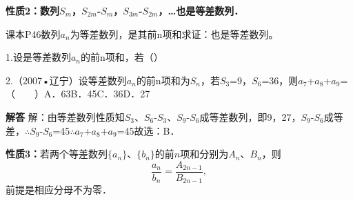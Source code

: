 \par\medskip\noindent\textbf{性质2：数列\ensuremath{S_{m}}，\ensuremath{S_{2m}}-\ensuremath{S_{m}}，\ensuremath{S_{3m}}-\ensuremath{S_{2m}}，\ldots{}也是等差数列．}\par
\qquad{}课本P46数列{\ensuremath{a_{n}}}为等差数列，是其前n项和求证：也是等差数列。\par
{}
1.设是等差数列{\ensuremath{a_{n}}}的前n项和，若（）\par
{}
2.（2007•辽宁）设等差数列{\ensuremath{a_{n}}}的前n项和为\ensuremath{S_{n}}，若\ensuremath{S_{3}}=9，\ensuremath{S_{6}}=36，则\ensuremath{a_{7}}+\ensuremath{a_{8}}+\ensuremath{a_{9}}=（　　）A．63\qquad{}B．45\qquad{}C．36\qquad{}D．27\qquad{}\par
\QuestionSpace{1.2cm}
\ifshowanswers
\par\begingroup\color{solutioncolor}\noindent\textbf{解答}\quad
解：由等差数列性质知\ensuremath{S_{3}}、\ensuremath{S_{6}}-\ensuremath{S_{3}}、\ensuremath{S_{9}}-\ensuremath{S_{6}}成等差数列，即9，27，\ensuremath{S_{9}}-\ensuremath{S_{6}}成等差，\ensuremath{\therefore}\ensuremath{S_{9}}-\ensuremath{S_{6}}=45\ensuremath{\therefore}\ensuremath{a_{7}}+\ensuremath{a_{8}}+\ensuremath{a_{9}}=45故选：B．\par
\par\endgroup\fi

\par\medskip\noindent\textbf{性质3：}若两个等差数列$\{a_n\}$、$\{b_n\}$的前$n$项和分别为$A_n$、$B_n$，则
\[
\frac{a_n}{b_n}=\frac{A_{2n-1}}{B_{2n-1}},
\]
前提是相应分母不为零．\par

